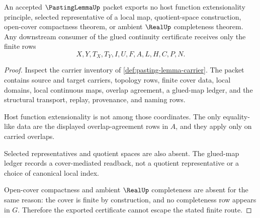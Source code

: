 \begin{theorem}
\label{thm:pasting-lemma-nonescape-boundary}
An accepted $\PastingLemmaUp$ packet exports no host function extensionality principle, selected representative of a local map, quotient-space construction, open-cover compactness theorem, or ambient $\RealUp$ completeness theorem. Any downstream consumer of the glued continuity certificate receives only the finite rows
$$
X,Y,T_X,T_Y,I,U,F,A,L,H,C,P,N .
$$
\end{theorem}
\begin{proof}
Inspect the carrier inventory of \autoref{def:pasting-lemma-carrier}. The packet contains source and target carriers, topology rows, finite cover data, local domains, local continuous maps, overlap agreement, a glued-map ledger, and the structural transport, replay, provenance, and naming rows.

Host function extensionality is not among those coordinates. The only equality-like data are the displayed overlap-agreement rows in $A$, and they apply only on carried overlaps.

Selected representatives and quotient spaces are also absent. The glued-map ledger records a cover-mediated readback, not a quotient representative or a choice of canonical local index.

Open-cover compactness and ambient $\RealUp$ completeness are absent for the same reason: the cover is finite by construction, and no completeness row appears in $G$. Therefore the exported certificate cannot escape the stated finite route.
\end{proof}




